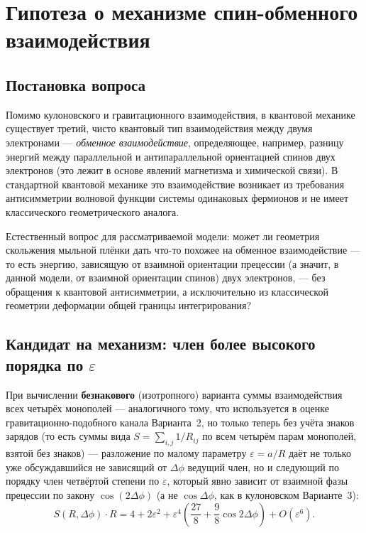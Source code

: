 \documentclass[12pt,a4paper]{article}
\begin{document}
\section{Гипотеза о механизме спин-обменного взаимодействия}
\label{sec:exchange}

\subsection{Постановка вопроса}

Помимо кулоновского и гравитационного взаимодействия, в квантовой
механике существует третий, чисто квантовый тип взаимодействия между
двумя электронами --- \emph{обменное взаимодействие}, определяющее,
например, разницу энергий между параллельной и антипараллельной
ориентацией спинов двух электронов (это лежит в основе явлений
магнетизма и химической связи). В стандартной квантовой механике это
взаимодействие возникает из требования антисимметрии волновой функции
системы одинаковых фермионов и не имеет классического
геометрического аналога.

Естественный вопрос для рассматриваемой модели: может ли геометрия
скольжения мыльной плёнки дать что-то похожее на обменное
взаимодействие --- то есть энергию, зависящую от взаимной ориентации
прецессии (а значит, в данной модели, от взаимной ориентации спинов)
двух электронов, --- без обращения к квантовой антисимметрии, а
исключительно из классической геометрии деформации общей границы
интегрирования?

\subsection{Кандидат на механизм: член более высокого порядка по $\varepsilon$}

При вычислении \textbf{безнакового} (изотропного) варианта суммы
взаимодействия всех четырёх монополей --- аналогичного тому, что
используется в оценке гравитационно-подобного канала Варианта~2, но
только теперь без учёта знаков зарядов (то есть суммы вида
$S=\sum_{i,j}1/R_{ij}$ по всем четырём парам монополей, взятой без
знаков) --- разложение по малому параметру $\varepsilon=a/R$ даёт не
только уже обсуждавшийся не зависящий от $\Delta\phi$ ведущий член, но
и следующий по порядку член четвёртой степени по $\varepsilon$, который
явно зависит от взаимной фазы прецессии по закону
$\cos(2\Delta\phi)$ (а не $\cos\Delta\phi$, как в кулоновском
Варианте~3):
\begin{equation}
S(R,\Delta\phi)\cdot R = 4+2\varepsilon^2+\varepsilon^4\left(\frac{27}{8}+\frac98\cos2\Delta\phi\right)+O(\varepsilon^6).
\end{equation}
\end{document}
